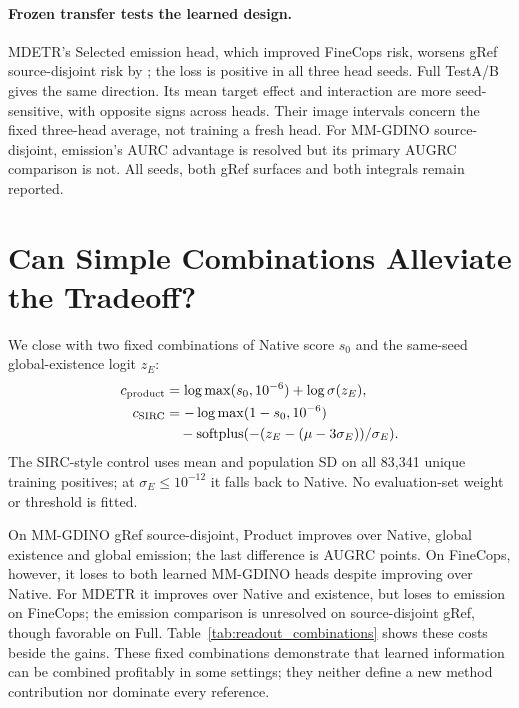 \documentclass[10pt,twocolumn,letterpaper]{article}
\begin{document}

\paragraph{Frozen transfer tests the learned design.}
MDETR's Selected emission head, which improved FineCops risk, worsens
gRef source-disjoint risk by \MDTransferReadout{}; the loss is positive
in all three head seeds. Full TestA/B gives the same direction.
Its mean target effect and interaction are more seed-sensitive, with
opposite signs across heads. Their image intervals concern the fixed
three-head average, not training a fresh head. For MM-GDINO source-disjoint,
emission's AURC advantage is resolved but its primary AUGRC comparison
is not. All seeds, both gRef surfaces and both integrals remain reported.

\section{Can Simple Combinations Alleviate the Tradeoff?}
We close with two fixed combinations of Native score $s_0$ and the
same-seed global-existence logit $z_E$:
\begin{align}
c_{\rm product}&=\log\max(s_0,10^{-6})+\log\sigma(z_E),\\
c_{\rm SIRC}&=-\log\max(1-s_0,10^{-6})\nonumber\\
&\quad-\operatorname{softplus}(-(z_E-(\mu-3\sigma_E))/\sigma_E).
\end{align}
The SIRC-style control \cite{xia2024sirc} uses mean and population SD
on all 83,341 unique training positives; at $\sigma_E\leq10^{-12}$
it falls back to Native. No evaluation-set weight or threshold is fitted.

On MM-GDINO gRef source-disjoint, Product improves over Native,
global existence and global emission; the last difference is
\MMTransferProduct{} AUGRC points. On FineCops, however, it loses
to both learned MM-GDINO heads despite improving over Native.
For MDETR it improves over Native and existence, but loses to emission
on FineCops; the emission comparison is unresolved on source-disjoint
gRef, though favorable on Full. Table~\ref{tab:readout_combinations}
shows these costs beside the gains. These fixed combinations demonstrate
that learned information can be combined profitably in some settings;
they neither define a new method contribution nor dominate every reference.
\end{document}

